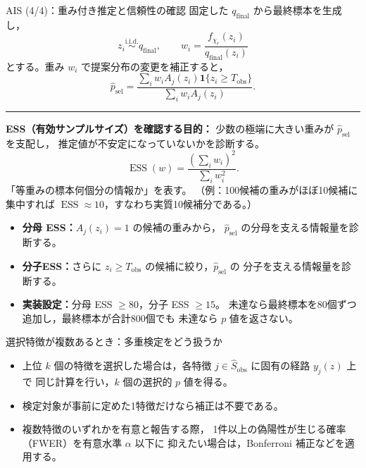 \documentclass[aspectratio=169,11pt]{beamer}
\begin{document}
\begin{frame}{AIS (4/4)：重み付き推定と信頼性の確認}
  \footnotesize
  \setlength{\abovedisplayskip}{3pt}
  \setlength{\belowdisplayskip}{3pt}
  固定した $q_{\mathrm{final}}$ から最終標本を生成し，
  \[
    z_i\overset{\mathrm{i.i.d.}}{\sim}q_{\mathrm{final}},
    \qquad
    w_i=\frac{f_{\chi_r}(z_i)}{q_{\mathrm{final}}(z_i)}
  \]
  とする。重み $w_i$ で提案分布の変更を補正すると，
  \[
    \widehat p_{\mathrm{sel}}
    =\frac{\sum_iw_iA_j(z_i)
      \mathbf1\{z_i\ge T_{\mathrm{obs}}\}}
    {\sum_iw_iA_j(z_i)}.
  \]

  \noindent\rule{\linewidth}{0.6pt}
  \vspace{-0.02cm}
  \textbf{ESS（有効サンプルサイズ）を確認する目的：}
  少数の極端に大きい重みが $\widehat p_{\mathrm{sel}}$ を支配し，
  推定値が不安定になっていないかを診断する。
  \[
    \operatorname{ESS}(w)=\frac{(\sum_i w_i)^2}{\sum_i w_i^2}.
  \]
  「等重みの標本何個分の情報か」を表す。
  （例：100候補の重みがほぼ10候補に集中すれば
  $\operatorname{ESS}\approx10$，すなわち実質10候補分である。）
  \begin{itemize}
    \setlength{\topsep}{0.02cm}
    \setlength{\itemsep}{0.02cm}
    \item \textbf{分母 ESS：}$A_j(z_i)=1$ の候補の重みから，
      $\widehat p_{\mathrm{sel}}$ の分母を支える情報量を診断する。
    \item \textbf{分子ESS：}さらに $z_i\ge T_{\mathrm{obs}}$
      の候補に絞り，$\widehat p_{\mathrm{sel}}$ の
      分子を支える情報量を診断する。
    \item \textbf{実装設定：}分母 ESS $\ge80$，分子 ESS $\ge15$。
      未達なら最終標本を80個ずつ追加し，最終標本が合計800個でも
      未達なら $p$ 値を返さない。
  \end{itemize}
\end{frame}

\begin{frame}{選択特徴が複数あるとき：多重検定をどう扱うか}
  \begin{itemize}
    \setlength{\itemsep}{0.25cm}
    \item 上位 $k$ 個の特徴を選択した場合は，各特徴
      $j\in\widehat S_{\mathrm{obs}}$ に固有の経路 $y_j(z)$ 上で
      同じ計算を行い，$k$ 個の選択的 $p$ 値を得る。
    \item 検定対象が事前に定めた1特徴だけなら補正は不要である。
    \item 複数特徴のいずれかを有意と報告する際，
      1件以上の偽陽性が生じる確率（FWER）を有意水準 $\alpha$ 以下に
      抑えたい場合は，Bonferroni 補正などを適用する。
  \end{itemize}
\end{frame}
\end{document}
